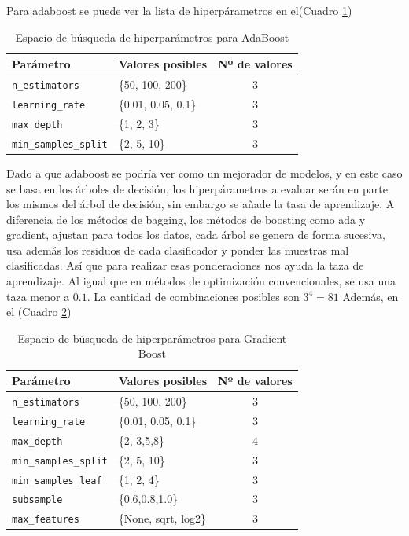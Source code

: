\documentclass[conference]{IEEEtran}
\begin{document}
Para adaboost se puede ver la lista de hiperpárametros en el(Cuadro \ref{tab:Tabla_2})
\begin{table}[ht]
\centering
\begin{tabular}{|l|l|c|}
\hline
\textbf{Parámetro} & \textbf{Valores posibles} & \textbf{Nº de valores} \\ \hline
\texttt{n\_estimators} & \{50, 100, 200\} & 3 \\ \hline
\texttt{learning\_rate} & \{0.01,  0.05, 0.1\} & 3 \\ \hline
\texttt{max\_depth} & \{1, 2, 3\} & 3 \\ \hline
\texttt{min\_samples\_split} & \{2, 5, 10\} & 3 \\ \hline
\end{tabular}
\caption{Espacio de búsqueda de hiperparámetros para AdaBoost}
    \label{tab:Tabla_2}
\end{table}
Dado a que adaboost se podría ver como un mejorador de modelos, y en este caso se basa en los árboles de decisión, los hiperpárametros a evaluar serán en parte los mismos del árbol de decisión, sin embargo se añade la tasa de aprendizaje. A diferencia de los métodos de bagging, los métodos de boosting como ada y gradient, ajustan para todos los datos, cada árbol se genera de forma sucesiva, usa además los residuos de cada clasificador y ponder las muestras mal clasificadas. Así que para realizar esas ponderaciones nos ayuda la taza de aprendizaje. Al igual que en métodos de optimización convencionales, se usa una taza menor a $0.1$. La cantidad de combinaciones posibles son $3^4=81$
Además, en el (Cuadro \ref{tab:Tabla_3})
\begin{table}[ht]
\centering
\begin{tabular}{|l|l|c|}
\hline
\textbf{Parámetro} & \textbf{Valores posibles} & \textbf{Nº de valores} \\ \hline
\texttt{n\_estimators} & \{50, 100, 200\} & 3 \\ \hline
\texttt{learning\_rate} & \{0.01,  0.05, 0.1\} & 3 \\ \hline
\texttt{max\_depth} & \{2, 3,5,8\} & 4 \\ \hline
\texttt{min\_samples\_split} & \{2, 5, 10\} & 3 \\ \hline
\texttt{min\_samples\_leaf} & \{1, 2, 4\} & 3 \\ \hline
\texttt{subsample} & \{0.6,0.8,1.0\} & 3 \\ \hline
\texttt{max\_features} & \{None, sqrt, log2\} & 3 \\ \hline
\end{tabular}
\caption{Espacio de búsqueda de hiperparámetros para Gradient Boost}
    \label{tab:Tabla_3}
\end{table}
\end{document}
